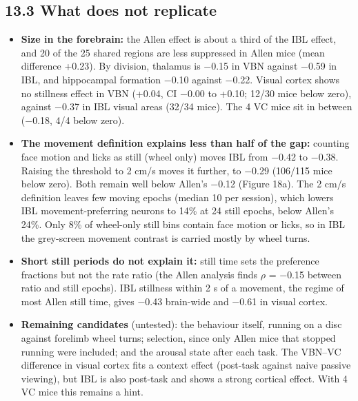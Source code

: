 \documentclass[10pt,a4paper]{article}
\begin{document}
\subsection{13.3 What does not replicate}
\begin{itemize}
\item \textbf{Size in the forebrain:} the Allen effect is about a third of the IBL effect, and 20 of the 25 shared regions are less suppressed in Allen mice (mean difference +0.23). By division, thalamus is $-$0.15 in VBN against $-$0.59 in IBL, and hippocampal formation $-$0.10 against $-$0.22. Visual cortex shows no stillness effect in VBN (+0.04, CI $-$0.00 to +0.10; 12/30 mice below zero), against $-$0.37 in IBL visual areas (32/34 mice). The 4 VC mice sit in between ($-$0.18, 4/4 below zero).
\item \textbf{The movement definition explains less than half of the gap:} counting face motion and licks as still (wheel only) moves IBL from $-$0.42 to $-$0.38. Raising the threshold to 2 cm/s moves it further, to $-$0.29 (106/115 mice below zero). Both remain well below Allen's $-$0.12 (Figure 18a). The 2 cm/s definition leaves few moving epochs (median 10 per session), which lowers IBL movement-preferring neurons to 14\% at 24 still epochs, below Allen's 24\%. Only 8\% of wheel-only still bins contain face motion or licks, so in IBL the grey-screen movement contrast is carried mostly by wheel turns.
\item \textbf{Short still periods do not explain it:} still time sets the preference fractions but not the rate ratio (the Allen analysis finds $\rho$ = $-$0.15 between ratio and still epochs). IBL stillness within 2 s of a movement, the regime of most Allen still time, gives $-$0.43 brain-wide and $-$0.61 in visual cortex.
\item \textbf{Remaining candidates} (untested): the behaviour itself, running on a disc against forelimb wheel turns; selection, since only Allen mice that stopped running were included; and the arousal state after each task. The VBN--VC difference in visual cortex fits a context effect (post-task against naive passive viewing), but IBL is also post-task and shows a strong cortical effect. With 4 VC mice this remains a hint.
\end{itemize}
\end{document}
